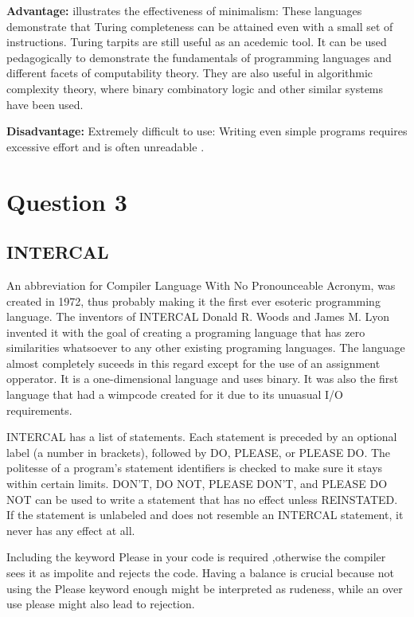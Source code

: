 \documentclass{article}  %
\begin{document}
\textbf{Advantage:}  
illustrates the effectiveness of minimalism: These languages demonstrate that Turing completeness can be attained even with a small set of instructions. Turing tarpits are still useful as an acedemic tool. It can be used pedagogically to demonstrate the fundamentals of programming languages and different facets of computability theory. They are also useful in algorithmic complexity theory, where binary combinatory logic and other similar systems have been used.

\textbf{Disadvantage:}  
Extremely difficult to use: Writing even simple programs requires excessive effort and is often unreadable \cite{turingtarpit1967}.

\section{Question 3}

\subsection{INTERCAL}
An abbreviation for Compiler Language With No Pronounceable Acronym, was created in 1972, thus probably making it the first ever esoteric programming language. The inventors of INTERCAL Donald R. Woods and James M. Lyon invented it with the goal of creating a programing language that has zero similarities whatsoever to any other existing programing languages. The language almost completely suceeds in this regard except for the use of an assignment opperator. It is a one-dimensional language and uses binary. It was also the first language that had a wimpcode created for it due to its unuasual I/O requirements.

INTERCAL has a list of statements. Each statement is preceded by an optional label (a number in brackets), followed by DO, PLEASE, or PLEASE DO. The politesse of a program's statement identifiers is checked to make sure it stays within certain limits. DON'T, DO NOT, PLEASE DON'T, and PLEASE DO NOT can be used to write a statement that has no effect unless REINSTATED. If the statement is unlabeled and does not resemble an INTERCAL statement, it never has any effect at all.

Including the keyword Please in your code is required ,otherwise the compiler sees it as impolite and rejects the code. Having a balance is crucial because not using the Please keyword enough might be interpreted as rudeness, while an over use please might also lead to rejection.
\end{document}
